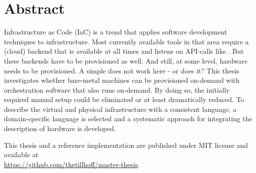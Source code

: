 \titlespacing*{\chapter}{170pt}{0pt}{10pt} %

\chapter*{Abstract}
\begin{addmargin}[2em]{2em}
Infrastructure as Code (IaC) is a trend that applies software development techniques to infrastructure.
Most currently available tools in that area require a (cloud) backend that is available at all times and listens on API-calls like .
But these backends have to be provisioned as well.
And still, at some level, hardware needs to be provisioned.
A simple  does not work here - or does it?
This thesis investigates whether bare-metal machines can be provisioned on-demand with orchestration software that also runs on-demand.
By doing so, the initially required manual setup could be eliminated or at least dramatically reduced.
To describe the virtual and physical infrastructure with a consistent language, a domain-specific language is selected and a systematic approach for integrating the description of hardware is developed.

\end{addmargin}

\bigskip
\begin{addmargin}[2em]{2em}
This thesis and a reference implementation are published under MIT license and available at \\
\url{https://github.com/thetillhoff/master-thesis}.
\end{addmargin}


\titlespacing*{\chapter}{0pt}{0pt}{10pt} %
